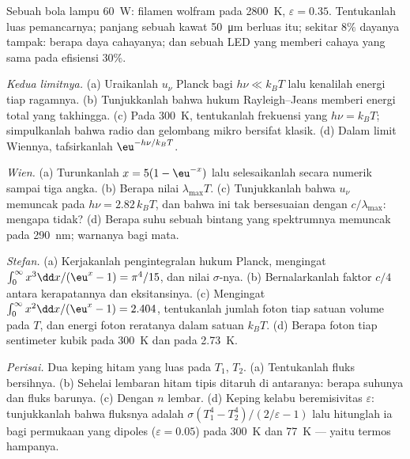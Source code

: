\begin{exercise}[$\star$]\label{exo:b2:thermal-radiation:4}
Sebuah bola lampu \qty{60}{W}: filamen wolfram pada \qty{2800}{K}, $\varepsilon = 0.35$.
Tentukanlah luas pemancarnya; panjang sebuah kawat \qty{50}{\micro m} berluas itu;
sekitar $8\%$ dayanya tampak: berapa daya cahayanya; dan sebuah LED yang memberi
cahaya yang sama pada efisiensi $30\%$.
\end{exercise}

\begin{exercise}[$\star\star$]\label{exo:b2:thermal-radiation:5}
\emph{Kedua limitnya.} (a) Uraikanlah $u_\nu$ Planck bagi $h\nu \ll k_BT$ lalu
kenalilah energi tiap ragamnya. (b) Tunjukkanlah bahwa hukum Rayleigh--Jeans
memberi energi total yang takhingga. (c) Pada \qty{300}{K}, tentukanlah frekuensi yang
$h\nu = k_BT$; simpulkanlah bahwa  radio dan gelombang mikro
bersifat klasik. (d) Dalam limit Wiennya, tafsirkanlah $\eu^{-h\nu/k_BT}$.
\end{exercise}

\begin{exercise}[$\star\star$]\label{exo:b2:thermal-radiation:6}
\emph{Wien.} (a) Turunkanlah $x = 5(1 - \eu^{-x})$ lalu selesaikanlah secara numerik
sampai tiga angka. (b) Berapa nilai $\lambda_{\max}T$. (c) Tunjukkanlah bahwa $u_\nu$
memuncak pada $h\nu = 2.82\,k_BT$, dan bahwa ini tak bersesuaian dengan
$c/\lambda_{\max}$: mengapa tidak? (d) Berapa suhu sebuah bintang yang spektrumnya
memuncak pada \qty{290}{nm}; warnanya bagi mata.
\end{exercise}

\begin{exercise}[$\star\star$]\label{exo:b2:thermal-radiation:7}
\emph{Stefan.} (a) Kerjakanlah pengintegralan hukum Planck, mengingat
$\int_0^\infty x^3\dd x/(\eu^x - 1) = \pi^4/15$, dan nilai $\sigma$-nya.
(b) Bernalarkanlah faktor $c/4$ antara kerapatannya dan eksitansinya. (c)
Mengingat $\int_0^\infty x^2\dd x/(\eu^x - 1) = 2.404$, tentukanlah jumlah foton
tiap satuan volume pada $T$, dan energi foton reratanya dalam satuan $k_BT$.
(d) Berapa foton tiap sentimeter kubik pada \qty{300}{K} dan pada \qty{2.73}{K}.
\end{exercise}

\begin{exercise}[$\star\star$]\label{exo:b2:thermal-radiation:8}
\emph{Perisai.} Dua keping hitam yang luas pada $T_1$, $T_2$. (a) Tentukanlah fluks bersihnya.
(b) Sehelai lembaran hitam tipis ditaruh di antaranya: berapa suhunya dan
fluks barunya. (c) Dengan $n$ lembar. (d) Keping kelabu beremisivitas $\varepsilon$:
tunjukkanlah bahwa fluksnya adalah $\sigma(T_1^4 - T_2^4)/(2/\varepsilon - 1)$ lalu hitunglah
ia bagi permukaan yang dipoles ($\varepsilon = 0.05$) pada \qty{300}{K} dan
\qty{77}{K} --- yaitu termos hampanya.
\end{exercise}

